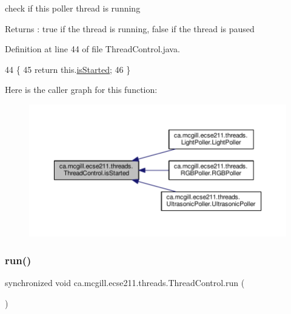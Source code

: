 check if this poller thread is running

\begin{DoxyReturn}{Returns}
\+: true if the thread is running, false if the thread is paused 
\end{DoxyReturn}


Definition at line 44 of file Thread\+Control.\+java.


\begin{DoxyCode}
44                                           \{
45     \textcolor{keywordflow}{return} this.\hyperlink{classca_1_1mcgill_1_1ecse211_1_1threads_1_1_thread_control_a92f4933511db42476e39956246bcf2fe}{isStarted};
46   \}
\end{DoxyCode}
Here is the caller graph for this function\+:\nopagebreak
\begin{figure}[H]
\begin{center}
\leavevmode
\includegraphics[width=350pt]{classca_1_1mcgill_1_1ecse211_1_1threads_1_1_thread_control_a92f4933511db42476e39956246bcf2fe_icgraph}
\end{center}
\end{figure}
\mbox{\label{classca_1_1mcgill_1_1ecse211_1_1threads_1_1_thread_control_a03e743000ea2c37080427565e8ec5f35}} 
\subsubsection{\texorpdfstring{run()}{run()}}
{\footnotesize\ttfamily synchronized void ca.\+mcgill.\+ecse211.\+threads.\+Thread\+Control.\+run (\begin{DoxyParamCaption}{ }\end{DoxyParamCaption})}

